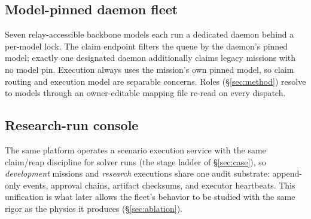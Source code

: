 \subsection{Model-pinned daemon fleet}
Seven relay-accessible backbone models each run a dedicated daemon
behind a per-model lock. The claim endpoint filters the queue by the
daemon's pinned model; exactly one designated daemon additionally claims
legacy missions with no model pin. Execution always uses the mission's
own pinned model, so claim routing and execution model are separable
concerns. Roles (\S\ref{sec:method}) resolve to models through an
owner-editable mapping file re-read on every dispatch.

\subsection{Research-run console}
The same platform operates a scenario execution service with the same
claim/reap discipline for solver runs (the stage ladder of
\S\ref{sec:case}), so \emph{development} missions and \emph{research}
executions share one audit substrate: append-only events, approval
chains, artifact checksums, and executor heartbeats. This unification is
what later allows the fleet's behavior to be studied with the same rigor
as the physics it produces (\S\ref{sec:ablation}).
